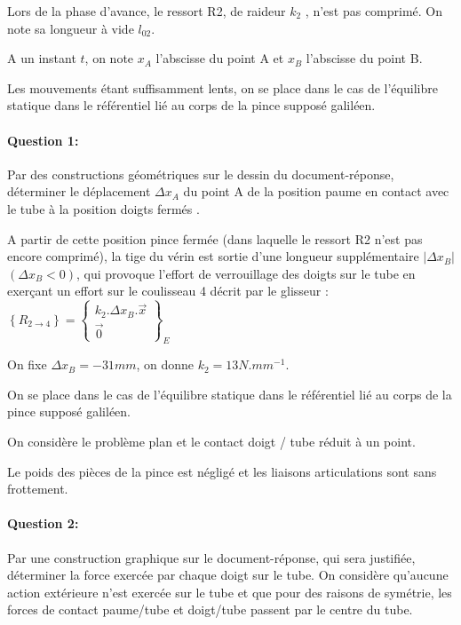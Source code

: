 Lors de la phase d'avance, le ressort R2, de raideur $k_2$ , n'est pas comprimé. On note sa longueur à vide $l_{02}$.

A un instant $t$, on note $x_A$ l'abscisse du point A et $x_B$ l'abscisse du point B.

Les mouvements étant suffisamment lents, on se place dans le cas de l'équilibre statique dans le référentiel lié au corps de la pince supposé galiléen.

\paragraph{Question 1:}

Par des constructions géométriques sur le dessin du document-réponse, déterminer le déplacement $\Delta x_A$ du point A de la position \og paume en contact avec le tube \fg à la position \og doigts fermés \fg.

A partir de cette position \og pince fermée \fg (dans laquelle le ressort R2 n'est pas encore comprimé), la tige du vérin est sortie d'une longueur supplémentaire $|\Delta x_B|$ $\left(\Delta x_B <0\right)$, qui provoque l'effort de verrouillage des doigts sur le tube en exerçant un effort sur le coulisseau 4 décrit par le glisseur :
$\left\{R_{2 \rightarrow 4}\right\}=\left\{
\begin{array}{c}
 k_2.\Delta x_B.\overrightarrow{x} \\
 \overrightarrow{0}
\end{array}\right\}_E$

On fixe $\Delta x_B=-31mm$, on donne $k_2=13N.mm^{-1}$.

On se place dans le cas de l'équilibre statique dans le référentiel lié au corps de la pince supposé galiléen.

On considère le problème plan et le contact doigt / tube réduit à un point.

Le poids des pièces de la pince est négligé et les liaisons articulations sont sans frottement.

\paragraph{Question 2:}

Par une construction graphique sur le document-réponse, qui sera justifiée, déterminer la force exercée par chaque doigt sur le tube. On considère qu'aucune action extérieure n'est exercée sur le tube et que pour des raisons de symétrie, les forces de contact paume/tube et doigt/tube passent par le centre du tube.

